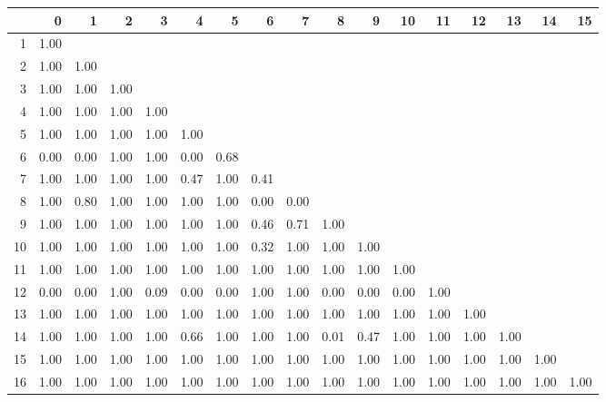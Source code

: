 % 
\begin{tabular}{rrrrrrrrrrrrrrrrr}
  \hline
 & 0 & 1 & 2 & 3 & 4 & 5 & 6 & 7 & 8 & 9 & 10 & 11 & 12 & 13 & 14 & 15 \\ 
  \hline
1 & 1.00 &  &  &  &  &  &  &  &  &  &  &  &  &  &  &  \\ 
  2 & 1.00 & 1.00 &  &  &  &  &  &  &  &  &  &  &  &  &  &  \\ 
  3 & 1.00 & 1.00 & 1.00 &  &  &  &  &  &  &  &  &  &  &  &  &  \\ 
  4 & 1.00 & 1.00 & 1.00 & 1.00 &  &  &  &  &  &  &  &  &  &  &  &  \\ 
  5 & 1.00 & 1.00 & 1.00 & 1.00 & 1.00 &  &  &  &  &  &  &  &  &  &  &  \\ 
  6 & 0.00 & 0.00 & 1.00 & 1.00 & 0.00 & 0.68 &  &  &  &  &  &  &  &  &  &  \\ 
  7 & 1.00 & 1.00 & 1.00 & 1.00 & 0.47 & 1.00 & 0.41 &  &  &  &  &  &  &  &  &  \\ 
  8 & 1.00 & 0.80 & 1.00 & 1.00 & 1.00 & 1.00 & 0.00 & 0.00 &  &  &  &  &  &  &  &  \\ 
  9 & 1.00 & 1.00 & 1.00 & 1.00 & 1.00 & 1.00 & 0.46 & 0.71 & 1.00 &  &  &  &  &  &  &  \\ 
  10 & 1.00 & 1.00 & 1.00 & 1.00 & 1.00 & 1.00 & 0.32 & 1.00 & 1.00 & 1.00 &  &  &  &  &  &  \\ 
  11 & 1.00 & 1.00 & 1.00 & 1.00 & 1.00 & 1.00 & 1.00 & 1.00 & 1.00 & 1.00 & 1.00 &  &  &  &  &  \\ 
  12 & 0.00 & 0.00 & 1.00 & 0.09 & 0.00 & 0.00 & 1.00 & 1.00 & 0.00 & 0.00 & 0.00 & 1.00 &  &  &  &  \\ 
  13 & 1.00 & 1.00 & 1.00 & 1.00 & 1.00 & 1.00 & 1.00 & 1.00 & 1.00 & 1.00 & 1.00 & 1.00 & 1.00 &  &  &  \\ 
  14 & 1.00 & 1.00 & 1.00 & 1.00 & 0.66 & 1.00 & 1.00 & 1.00 & 0.01 & 0.47 & 1.00 & 1.00 & 1.00 & 1.00 &  &  \\ 
  15 & 1.00 & 1.00 & 1.00 & 1.00 & 1.00 & 1.00 & 1.00 & 1.00 & 1.00 & 1.00 & 1.00 & 1.00 & 1.00 & 1.00 & 1.00 &  \\ 
  16 & 1.00 & 1.00 & 1.00 & 1.00 & 1.00 & 1.00 & 1.00 & 1.00 & 1.00 & 1.00 & 1.00 & 1.00 & 1.00 & 1.00 & 1.00 & 1.00 \\ 
   \hline
\end{tabular}
% 
